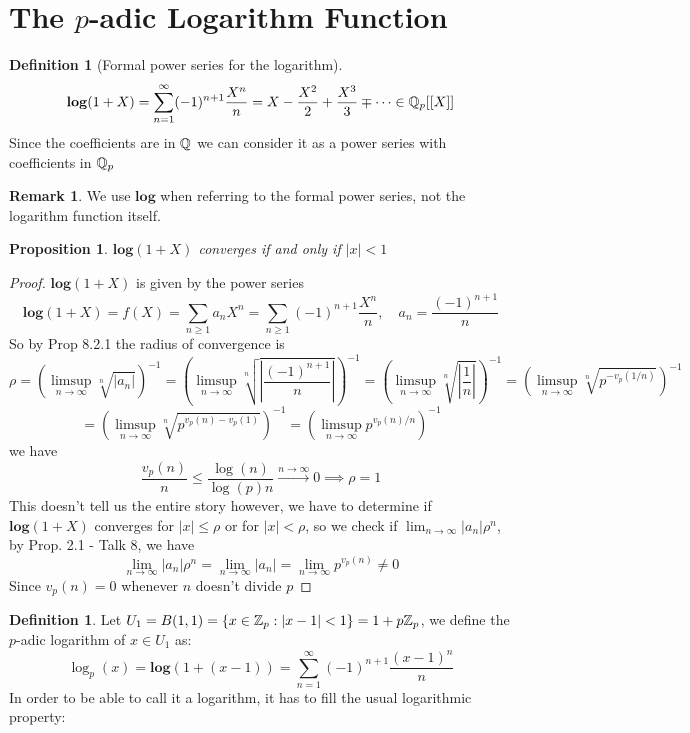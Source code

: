\documentclass[a4paper]{article}
\theoremstyle{plain}
\newtheorem{prop}[thm]{Proposition}
\theoremstyle{definition}
\newtheorem{defi}[thm]{Definition}
\newtheorem{rem}[thm]{Remark}
\begin{document}
\section{The $p$-adic Logarithm Function}
\begin{defi}[Formal power series for the logarithm]
  $$\mathbf{log}(1+X) = \sum_{n=1}^{\infty} (-1)^{n+1}\frac {X^{n}}{n} = X - \frac{X^{2}}{2} + \frac{X^{3}}{3} \mp \cdots \in \Bbb Q_{p}[[X]]$$
  Since the coefficients are in $\Bbb Q$ we can consider it as a power series with coefficients in $\Bbb Q_{p}$
\end{defi}
\begin{rem}
We use $\mathbf{log}$ when referring to the formal power series, not the logarithm function itself.
\end{rem}
\begin{prop} $\mathbf{log}(1+X)$ converges if and only if $|x| < 1$
\end{prop}
\begin{proof}
  $\mathbf{log}(1+X)$ is given by the power series
  $$\mathbf{log}(1+X) = f(X) = \sum_{n \geq 1}a_{n}X^{n} = \sum_{n\geq1} (-1)^{n+1}\frac {X^{n}}{n}, \quad a_{n} = \frac {(-1)^{n+1}}n $$
  So by Prop 8.2.1 the radius of convergence is
  $$\rho = \left(\limsup_{n \to \infty} \sqrt[n]{|a_{n}|}\right)^{-1} = \left(\limsup_{n \to \infty} \sqrt[n]{\left|\frac {(-1)^{n+1}}n\right|}\right)^{-1} = \left(\limsup_{n \to \infty} \sqrt[n]{\left| \frac 1n\right|}\right)^{-1} = \left(\limsup_{n \to \infty} \sqrt[n]{p^{-v_{p}(1/n)}}\right)^{-1}$$
  $$ = \left(\limsup_{n \to \infty} \sqrt[n]{p^{v_{p}(n) - v_{p}(1)}}\right)^{-1} = \left( \limsup_{n \to \infty} p^{v_{p}(n) / n} \right)^{-1}$$
  we have
  $$\frac{v_{p}(n)}{n} \leq \frac{\log(n)}{\log(p)n} \xrightarrow{n \to \infty} 0 \implies \rho = 1$$
  This doesn't tell us the entire story however, we have to determine if $\mathbf{log}(1+X)$ converges for $|x| \leq \rho$ or for $|x| < \rho$, so we check if $\lim_{n \to \infty}|a_{n}|\rho^{n}$, by Prop. 2.1 - Talk 8, we have
  $$\lim_{n \to \infty}|a_{n}|\rho^{n} = \lim_{n \to \infty}|a_{n}| = \lim_{n \to \infty}p^{v_{p}(n)} \neq 0$$
  Since $v_{p}(n) = 0$ whenever $n$ doesn't divide $p$

\end{proof}
\begin{defi}Let $U_{1} = B(1,1) = \{x \in \Bbb Z_{p} : |x-1| < 1\} = 1+p\Bbb Z_{p}$, we define the $p$-adic logarithm of $x \in U_{1}$ as:
  $$\log_{p}(x) = \mathbf{log}(1+(x-1)) = \sum_{n=1}^{\infty} (-1)^{n+1}\frac {(x-1)^{n}}{n}$$
  In order to be able to call it a logarithm, it has to fill the usual logarithmic property:
\end{defi}
\end{document}
